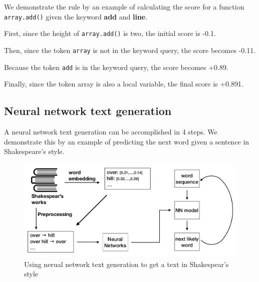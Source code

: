 \documentclass[PRO,english]{ipsj}
\begin{document}




We demonstrate the rule by an example of calculating the score for a function \texttt{array.add()} given the keyword \textbf{add} and \textbf{line}.

First, since the height of \texttt{array.add()} is two, the initial score is -0.1.

Then, since the token \texttt{array} is not in the keyword query, the score becomes -0.11.

Because the token \texttt{add} is in the keyword query, the score becomes +0.89.

Finally, since the token array is also a local variable, the final score is +0.891.

\subsection{Neural network text generation}
A neural network text generation can be accomplished in 4 steps. We demonstrate this by an example of predicting the next word given a sentence in Shakespeare's style. 

\begin{figure}[!ht]
\centering
\includegraphics[scale=0.3]{Figure/NNTG.pdf}
\caption{Using nerual network text generation to get a text in Shakespear's style}
\label{fig:NNTG}
\end{figure}
\end{document}
